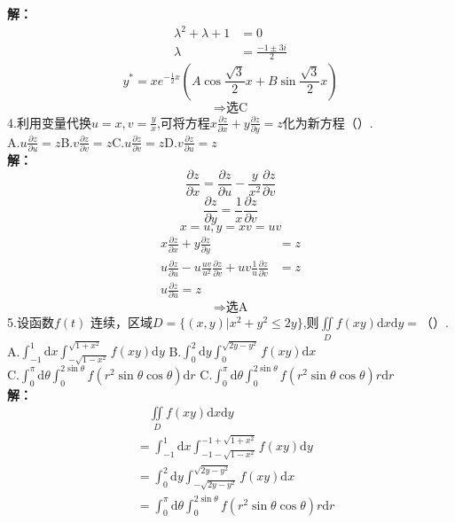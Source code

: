 \documentclass[a4paper]{article}
\begin{document}
\textbf{解：}
\begin{align*}
    \lambda^2 + \lambda +1 &=0\\
    \lambda&=\frac{-1 \pm 3i}{2}
\end{align*}
$$y^{*}=xe^{-\frac{1}{2}x}\left(A\cos \frac{\sqrt{3}}{2}x+B\sin \frac{\sqrt{3}}{2}x\right)$$
$$\Rightarrow \text{选C}$$
4.利用变量代换$u=x,v=\frac{y}{x}$,可将方程$x\frac{\partial z}{\partial x}+y\frac{\partial z}{\partial y}=z$化为新方程（\quad）.\\
A.$u\frac{\partial z}{\partial u}=z$\hfill B.$v\frac{\partial z}{\partial v}=z$\hfill C.$u\frac{\partial z}{\partial v}=z $\hfill  D.$v\frac{\partial z}{\partial u}=z$\\
\textbf{解：}
$$\frac{\partial z}{\partial x}=\frac{\partial z}{\partial u}-\frac{y}{x^2}\frac{\partial z}{\partial v}$$
$$\frac{\partial z}{\partial y}=\frac{1}{x}\frac{\partial z}{\partial v}$$
$$x=u,y=xv=uv$$
\begin{align*}
    x\frac{\partial z}{\partial x}+y\frac{\partial z}{\partial y}&=z\\
    u\frac{\partial z}{\partial u}-u\frac{uv}{u^2}\frac{\partial z}{\partial v}+uv\frac{1}{u}\frac{\partial z}{\partial v}&=z\\
    u\frac{\partial z}{\partial u}=z
\end{align*}
$$\Rightarrow \text{选A}$$
5.设函数$f(t)$ 连续，区域$D=\{\left. \left(x,y\right) \right| x^2+y^2\le 2y \}$,则$\iint\limits_{D}f(xy)\mathrm{d}x\mathrm{d}y=$（\quad）.\\
A.$\int_{-1}^{1}\mathrm{d}x\int_{-\sqrt{1-x^2}}^{\sqrt{1+x^2}}f(xy)\mathrm{d}y$\hfill
B.$\int_{0}^{2}\mathrm{d}y\int_{0}^{\sqrt{2y-y^2}}f(xy)\mathrm{d}x$\\
C.$\int_{0}^{\pi}\mathrm{d}\theta\int_{0}^{2\sin \theta}f(r^2\sin\theta\cos\theta)\mathrm{d}r$\hfill
C.$\int_{0}^{\pi}\mathrm{d}\theta\int_{0}^{2\sin \theta}f(r^2\sin\theta\cos\theta)r\mathrm{d}r$\\
\textbf{解：}
\begin{align*}
    &\quad \iint\limits_{D}f(xy)\mathrm{d}x\mathrm{d}y\\
    &= \int_{-1}^{1}\mathrm{d}x\int_{-1-\sqrt{1-x^2}}^{-1+\sqrt{1+x^2}}f(xy)\mathrm{d}y\\
    &= \int_{0}^{2}\mathrm{d}y\int_{-\sqrt{2y-y^2}}^{\sqrt{2y-y^2}}f(xy)\mathrm{d}x\\
    &= \int_{0}^{\pi}\mathrm{d}\theta\int_{0}^{2\sin \theta}f(r^2\sin\theta\cos\theta)r\mathrm{d}r
\end{align*}
\end{document}
